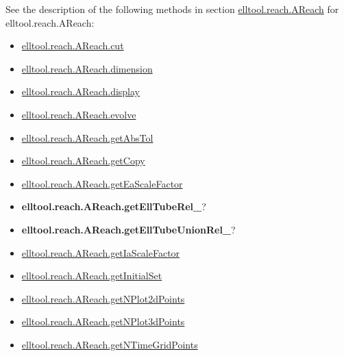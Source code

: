 \documentclass[letterpaper,10pt,english]{sphinxmanual}
\begin{document}
See the description of the following methods in section
{\hyperref[chap_func:elltool-reach-areach]{elltool.reach.AReach}} for elltool.reach.AReach:
\begin{itemize}
\item {} 
{\hyperref[chap_func:elltool-reach-areach-cut]{elltool.reach.AReach.cut}}

\item {} 
{\hyperref[chap_func:elltool-reach-areach-dimension]{elltool.reach.AReach.dimension}}

\item {} 
{\hyperref[chap_func:elltool-reach-areach-display]{elltool.reach.AReach.display}}

\item {} 
{\hyperref[chap_func:elltool-reach-areach-evolve]{elltool.reach.AReach.evolve}}

\item {} 
{\hyperref[chap_func:elltool-reach-areach-getabstol]{elltool.reach.AReach.getAbsTol}}

\item {} 
{\hyperref[chap_func:elltool-reach-areach-getcopy]{elltool.reach.AReach.getCopy}}

\item {} 
{\hyperref[chap_func:elltool-reach-areach-geteascalefactor]{elltool.reach.AReach.getEaScaleFactor}}

\item {} 
{\color{red}\bfseries{}elltool.reach.AReach.getEllTubeRel\_}?

\item {} 
{\color{red}\bfseries{}elltool.reach.AReach.getEllTubeUnionRel\_}?

\item {} 
{\hyperref[chap_func:elltool-reach-areach-getiascalefactor]{elltool.reach.AReach.getIaScaleFactor}}

\item {} 
{\hyperref[chap_func:elltool-reach-areach-getinitialset]{elltool.reach.AReach.getInitialSet}}

\item {} 
{\hyperref[chap_func:elltool-reach-areach-getnplot2dpoints]{elltool.reach.AReach.getNPlot2dPoints}}

\item {} 
{\hyperref[chap_func:elltool-reach-areach-getnplot3dpoints]{elltool.reach.AReach.getNPlot3dPoints}}

\item {} 
{\hyperref[chap_func:elltool-reach-areach-getntimegridpoints]{elltool.reach.AReach.getNTimeGridPoints}}


\end{itemize}
\end{document}

